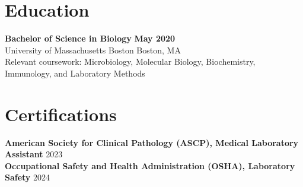 \documentclass[10pt,letterpaper]{article}
\begin{document}
\section*{Education}
\textbf{Bachelor of Science in Biology} \hfill \textbf{May 2020}\\[-1pt]
University of Massachusetts Boston \hfill Boston, MA\\[-1pt]
Relevant coursework: Microbiology, Molecular Biology, Biochemistry, Immunology, and Laboratory Methods

\section*{Certifications}
\textbf{American Society for Clinical Pathology (ASCP), Medical Laboratory Assistant} \hfill 2023\\[-1pt]
\textbf{Occupational Safety and Health Administration (OSHA), Laboratory Safety} \hfill 2024
\end{document}
